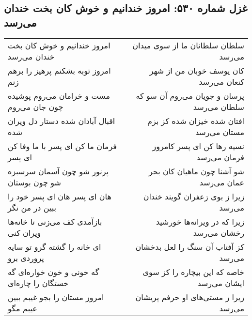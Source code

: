 \begin{center}
\section*{غزل شماره ۵۳۰: امروز خندانیم و خوش کان بخت خندان می‌رسد}
\label{sec:0530}
\begin{longtable}{l p{0.5cm} r}
امروز خندانیم و خوش کان بخت خندان می‌رسد
&&
سلطان سلطانان ما از سوی میدان می‌رسد
\\
امروز توبه بشکنم پرهیز را برهم زنم
&&
کان یوسف خوبان من از شهر کنعان می‌رسد
\\
مست و خرامان می‌روم پوشیده چون جان می‌روم
&&
پرسان و جویان می‌روم آن سو که سلطان می‌رسد
\\
اقبال آبادان شده دستار دل ویران شده
&&
افتان شده خیزان شده کز بزم مستان می‌رسد
\\
فرمان ما کن ای پسر با ما وفا کن ای پسر
&&
نسیه رها کن ای پسر کامروز فرمان می‌رسد
\\
پرنور شو چون آسمان سرسبزه شو چون بوستان
&&
شو آشنا چون ماهیان کان بحر عمان می‌رسد
\\
هان ای پسر هان ای پسر خود را ببین در من نگر
&&
زیرا ز بوی زعفران گویند خندان می‌رسد
\\
بازآمدی کف می‌زنی تا خانه‌ها ویران کنی
&&
زیرا که در ویرانه‌ها خورشید رخشان می‌رسد
\\
ای خانه را گشته گرو تو سایه پروردی برو
&&
کز آفتاب آن سنگ را لعل بدخشان می‌رسد
\\
گه خونی و خون خواره‌ای گه خستگان را چاره‌ای
&&
خاصه که این بیچاره را کز سوی ایشان می‌رسد
\\
امروز مستان را بجو غیبم ببین عیبم مگو
&&
زیرا ز مستی‌های او حرفم پریشان می‌رسد
\\
\end{longtable}
\end{center}
